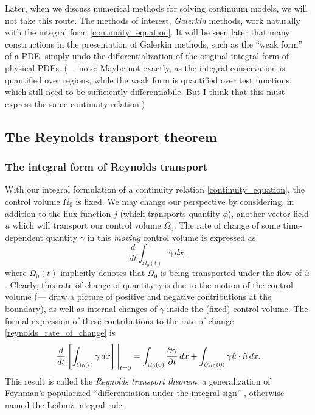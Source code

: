 \documentclass[11pt,a4paper]{memoir}
\newcommand{\Part}[2]{\frac{\partial #1}{\partial #2}}
\begin{document}
Later, when we discuss numerical methods for solving continuum models, we will not take this route. The methods of interest, \textit{Galerkin} methods,
work naturally with the integral form \eqref{continuity_equation}.
It will be seen later that many constructions in the presentation of Galerkin methods, such as the ``weak form'' of a PDE, simply undo the differentialization of the original integral form of physical PDEs.
(--- note: Maybe not exactly, as the integral conservation is quantified over regions, while the weak form is quantified over test functions,
which still need to be sufficiently differentiabile. But I think that this must express the same continuity relation.)

\subsection{The Reynolds transport theorem}
\subsubsection{The integral form of Reynolds transport}
With our integral formulation of a continuity relation \eqref{continuity_equation}, the control volume $\Omega_0$ is fixed.
We may change our perspective by considering, in addition to the flux function $j$ (which transports quantity $\phi$), another
vector field $\hat{u}$ which will transport our control volume $\Omega_0$. The rate of change of some time-dependent quantity $\gamma$ in this
\textit{moving} control volume is expressed as
\begin{equation}\label{reynolds_rate_of_change}
    \frac{d}{dt}\int_{\Omega_0(t)}\gamma\,dx,
\end{equation}
where $\Omega_0(t)$ implicitly denotes that $\Omega_0$ is being transported under the flow of $\hat{u}$.
Clearly, this rate of change of quantity $\gamma$ is due to the motion of the control volume (--- draw a picture of positive and negative contributions at
the boundary), as well as internal changes of $\gamma$ inside the (fixed) control volume.
The formal expression of these contributions to the rate of change \eqref{reynolds_rate_of_change} is
\begin{equation}\label{reynolds_transport_theorem}
    \eval{\frac{d}{dt}\left[\int_{\Omega_0(t)}\gamma\,dx\right]}_{t=0} =
        \int_{\Omega_0(0)}\Part{\gamma}{t}\,dx + \int_{\partial\Omega_0(0)}\gamma \hat{u}\cdot\hat{n} \,dx.
\end{equation}
This result is called the \textit{Reynolds transport theorem},
a generalization of Feynman's popularized ``differentiation under the integral sign'' \cite{feynman_trick},
otherwise named the Leibniz integral rule.
\end{document}
